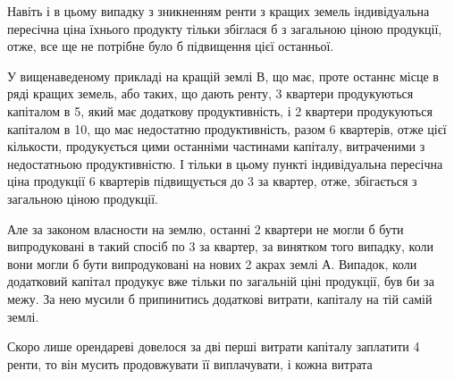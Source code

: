 Навіть і в цьому випадку з зникненням ренти з кращих земель індивідуальна
пересічна ціна їхнього продукту тільки збіглася б з загальною ціною продукції,
отже, все ще не потрібне було б підвищення цієї останньої.

У вищенаведеному прикладі на кращій землі $В$, що має, проте останнє
місце в ряді кращих земель, або таких, що дають ренту, 3 квартери продукуються
капіталом в 5, який має додаткову продуктивність, і 2 квартери
продукуються капіталом в 10, що має недостатню продуктивність,
разом 6 квартерів, отже  цієї кількости, продукується цими
останніми частинами капіталу, витраченими з недостатньою продуктивністю.
І тільки в цьому пункті індивідуальна пересічна ціна продукції 6 квартерів
підвищується до 3 за квартер, отже, збігається з загальною ціною
продукції.

Але за законом власности на землю, останні 2 квартери не могли б бути
випродуковані в такий спосіб по 3 за квартер, за винятком того
випадку, коли вони могли б бути випродуковані на нових 2 акрах землі
$А$. Випадок, коли додатковий капітал продукує вже тільки по загальній ціні
продукції, був би за межу. За нею мусили б припинитись додаткові витрати,
капіталу на тій самій землі.

Скоро лише орендареві довелося за дві перші витрати капіталу заплатити
4 ренти, то він мусить продовжувати її виплачувати, і кожна витрата
\parbreak{}  %
